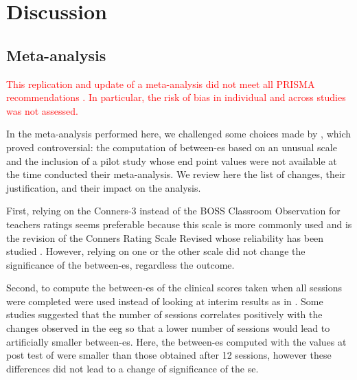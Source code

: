 


\section{Discussion}

\subsection{Meta-analysis} 

\textcolor{red}{This replication and update of a meta-analysis did not meet all PRISMA recommendations \citep{Moher2009}. In particular, the risk of bias
in individual and across studies was not assessed.}  

In the meta-analysis performed here, we challenged some choices made by \citeauthor{Cortese2016}, which proved controversial: 
the computation of between-\gls{es} based on an unusual scale \citep{Steiner2014} and the inclusion of a pilot study \citep{Arnold2014} 
whose end point values were not available at the time \citeauthor{Cortese2016} conducted their meta-analysis. We review here the 
list of changes, their justification, and their impact on the analysis.
 
First, relying on the Conners-3 \citep{Conners2011} instead of the BOSS Classroom Observation \citep{Shapiro2010} for
teachers ratings seems preferable because this scale is more commonly used \citep{Christiansen2014, Bluschke2016} and is
the revision of the Conners Rating Scale Revised \citep{Conners1998} whose reliability has been studied \citep{Collett2003}. 
However, relying on one or the other scale did not change the significance of the between-\gls{es}, regardless the outcome.

Second, to compute the between-\gls{es} of \citet{Arnold2014} the clinical scores taken when all sessions were completed were 
used instead of looking at interim results as in \citeauthor{Cortese2016}. Some studies suggested that the number of sessions 
correlates positively with the changes observed in the \gls{eeg} \citep{Vernon2004} so that a lower number of sessions would 
lead to artificially smaller between-\gls{es}. Here, the between-\gls{es} computed with the values at post test of \citet{Arnold2014} were smaller 
than those obtained after 12 sessions, however these differences did not lead to a change of significance of the \gls{se}. 

